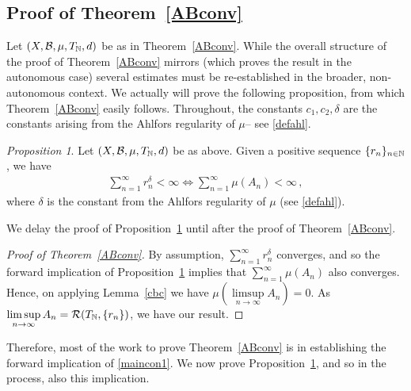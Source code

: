 \documentclass[11pt,reqno]{amsart}
\newcommand{\N}{{\Bbb N}}
\newcommand{\D}{{\Bbb D}}
\newcommand{\0}{\mathbf{0}}
\newtheorem{proposition}{Proposition}
\theoremstyle{remark}
\numberwithin{equation}{section}
\newtheorem{proposition}[theorem]{Proposition}
\theoremstyle{remark}
\numberwithin{equation}{section}
\begin{document}
\subsection{Proof of Theorem~\ref{ABconv}}  
Let $(X,\mathcal{B},\mu,T_{\N},d)$ be as in Theorem~\ref{ABconv}.
While the overall structure of the proof of Theorem~\ref{ABconv} mirrors \cite[Theorem~1.3]{HLSW} (which proves the result in the autonomous case) several estimates must be re-established in the broader, non-autonomous context. 
We actually will prove the following proposition, from which Theorem~\ref{ABconv} easily follows. Throughout, the constants $c_1,c_2, \delta$ are the constants arising from the Ahlfors regularity of $\mu$-- see \eqref{defahl}.
\begin{proposition}\label{maincon1iff} Let $(X,\mathcal{B},\mu,T_{\N},d)$ be as above. Given a positive sequence $\{r_n\}_{n \in \N}$, we have
   \begin{eqnarray}\label{maincon1}
    \sum_{n=1}^{\infty} r_n^\delta < \infty \iff  \sum_{n=1}^\infty \mu(A_n) < \infty \, ,
\end{eqnarray}
    where $\delta$ is the constant from the Ahlfors regularity of $\mu$ (see \eqref{defahl}).
\end{proposition}
We delay the proof of Proposition~\ref{maincon1iff} until after the proof of Theorem~\ref{ABconv}.
\begin{proof}[Proof of Theorem~\ref{ABconv}]
By assumption, $\sum_{n=1}^\infty r_n^\delta$ converges, and so the forward implication of Proposition~\ref{maincon1iff} implies that $\sum_{n =1}^\infty \mu(A_n)$ also converges. Hence, on applying Lemma~\ref{cbc} we have $\mu(\limsup\limits_{n \to \infty} A_n) =0$. As $\limsup\limits_{n \to \infty} A_n =\mathcal{R}(T_\N,\{r_n\})$, we have our result.
\end{proof}

Therefore, most of the work to prove Theorem~\ref{ABconv} is in establishing the forward implication of \eqref{maincon1}. We now prove Proposition~\ref{maincon1iff}, and so in the process, also this implication.
\end{document}
